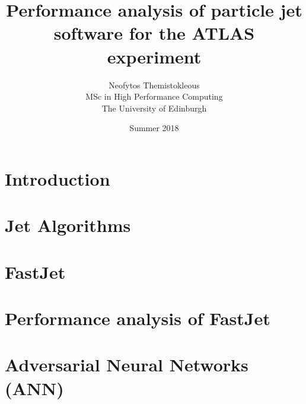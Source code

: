 \documentclass[12pt,a4paper,twoside]{report}
\begin{document}
\title{Performance analysis of particle jet software for the ATLAS experiment}
\author{Neofytos Themistokleous \\  MSc in High Performance Computing \vspace{1cm} \vspace{11cm} \\The University of Edinburgh}
\date{Summer 2018}

\makeEPCCtitle

\thispagestyle{empty}

\newpage



\newpage


\renewcommand*{\contentsname}{Short table of contents}


\renewcommand*{\contentsname}{Extended table of contents}
\setcounter{secnumdepth}{2}
\setcounter{tocdepth}{2}
\tableofcontents

\newpage
{}



\chapter{Introduction}




\chapter{Jet Algorithms}\label{ch:reconstruction}


\chapter{FastJet}\label{ch:fastjet}


\chapter{Performance analysis of FastJet}\label{ch:workfastjet}


\chapter{Adversarial Neural Networks (ANN)}\label{ch:chann}

\end{document}

